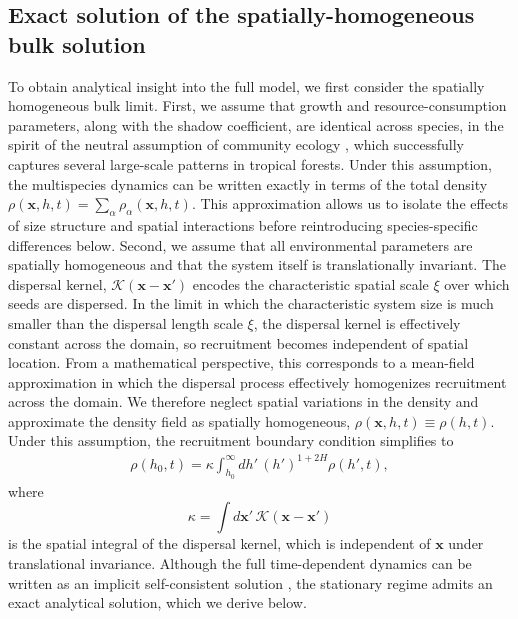 \documentclass[aps,pre,twocolumn,superscriptaddress,10pt]{revtex4-2}
\begin{document}
\subsection*{Exact solution of the spatially-homogeneous bulk solution}
To obtain analytical insight into the full model, we first consider the spatially homogeneous bulk limit.
First, we assume that growth and resource-consumption parameters, along with the shadow coefficient, are identical across species, in the spirit of the neutral assumption of community ecology \cite{Hubbell2001}, which successfully captures several large-scale patterns in tropical forests. Under this assumption, the multispecies dynamics can be written exactly in terms of the total density $\rho(\mathbf{x},h,t) = \sum_{\alpha}\rho_{\alpha}(\mathbf{x},h,t)$.
This approximation allows us to isolate the effects of size structure and spatial interactions before reintroducing species-specific differences below.
Second, we assume that all environmental parameters are spatially homogeneous and that the system itself is translationally invariant. The dispersal kernel, $\mathcal{K}(\mathbf{x} -\mathbf{x}')$ encodes the characteristic spatial scale $\xi$ over which seeds are dispersed.
In the limit in which the characteristic system size is much smaller than the dispersal length scale $\xi$, the dispersal kernel is effectively constant across the domain, so recruitment becomes independent of spatial location.
From a mathematical perspective, this corresponds to a mean-field approximation in which the dispersal process effectively homogenizes recruitment across the domain. We therefore neglect spatial variations in the density and approximate the density field as spatially homogeneous,
$\rho(\mathbf{x},h,t)\equiv \rho(h,t)$.
Under this assumption, the recruitment boundary condition simplifies to
\begin{align}
\rho(h_0,t) = \kappa \int_{h_0}^{\infty} dh'\, (h')^{1+2H}\rho(h',t),
\label{eq:injection-rate-mf}
\end{align}
where
\begin{equation}
\kappa = \int d\mathbf{x}'\,\mathcal{K}(\mathbf{x}-\mathbf{x}')
\end{equation}
is the spatial integral of the dispersal kernel, which is independent of $\mathbf{x}$ under translational invariance.
Although the full time-dependent dynamics can be written as an implicit self-consistent solution \SInoref, the stationary regime admits an exact analytical solution, which we derive below.
\end{document}
